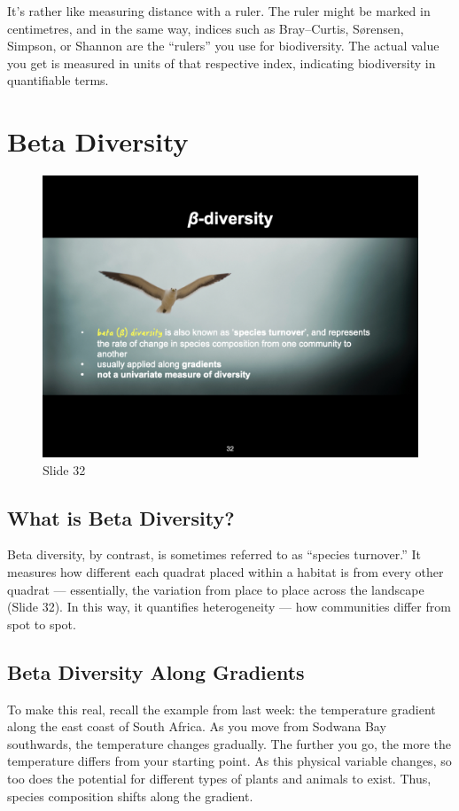 \documentclass[
  11pt,
]{book}
\begin{document}
It's rather like measuring distance with a ruler. The ruler might be
marked in centimetres, and in the same way, indices such as
Bray--Curtis, Sørensen, Simpson, or Shannon are the ``rulers'' you use
for biodiversity. The actual value you get is measured in units of that
respective index, indicating biodiversity in quantifiable terms.

\section{Beta Diversity}\label{beta-diversity}

\begin{figure}[ht]
\centering
\includegraphics[width=0.8\linewidth]{../images/BDC334/BDC334-032.jpeg}
\caption*{Slide 32}
\end{figure}

\subsection{What is Beta Diversity?}\label{what-is-beta-diversity}

Beta diversity, by contrast, is sometimes referred to as ``species
turnover.'' It measures how different each quadrat placed within a
habitat is from every other quadrat --- essentially, the variation from
place to place across the landscape (Slide 32). In this way, it
quantifies heterogeneity --- how communities differ from spot to spot.

\subsection{Beta Diversity Along
Gradients}\label{beta-diversity-along-gradients}

To make this real, recall the example from last week: the temperature
gradient along the east coast of South Africa. As you move from Sodwana
Bay southwards, the temperature changes gradually. The further you go,
the more the temperature differs from your starting point. As this
physical variable changes, so too does the potential for different types
of plants and animals to exist. Thus, species composition shifts along
the gradient.
\end{document}
